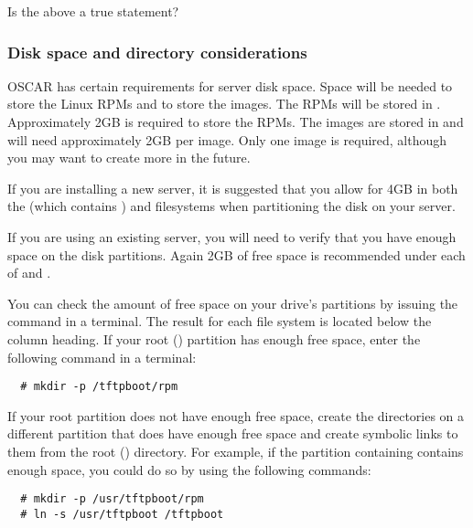 \begin{discuss}
  Is the above a true statement?
\end{discuss}


\subsubsection{Disk space and directory considerations}
\label{det:serverdiskpar}

OSCAR has certain requirements for server disk space. Space will be
needed to store the Linux RPMs and to store the images.  The RPMs will
be stored in . Approximately 2GB is required to
store the RPMs.  The images are stored in 
and will need approximately 2GB per image. Only one image is required,
although you may want to create more in the future.

If you are installing a new server, it is suggested that you allow for
4GB in both the \file{/} (which contains ) and
 filesystems when partitioning the disk on your server.

If you are using an existing server, you will need to verify that you
have enough space on the disk partitions.  Again 2GB of free space is
recommended under each of \file{/} and .

You can check the amount of free space on your drive's partitions by
issuing the command  in a terminal.  The result for each
file system is located below the  column heading. If
your root (\file{/}) partition has enough free space, enter the
following command in a terminal:

\begin{verbatim}
  # mkdir -p /tftpboot/rpm
\end{verbatim}
  
If your root partition does not have enough free space, create the
directories on a different partition that does have enough free space
and create symbolic links to them from the root (\file{/}) directory.
For example, if the partition containing  contains enough
space, you could do so by using the following commands:

\begin{verbatim}
  # mkdir -p /usr/tftpboot/rpm
  # ln -s /usr/tftpboot /tftpboot
\end{verbatim}

